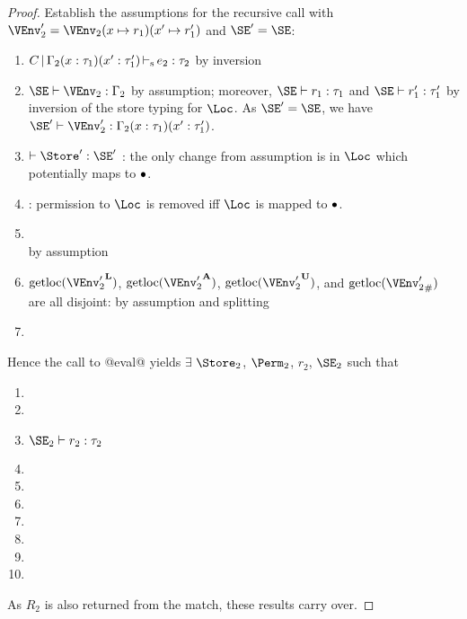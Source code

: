 \begin{proof}
  Establish the assumptions for the recursive call
  with $\VEnv'_2 = \VEnv_2 (x\mapsto r_1) (x' \mapsto r_1')$ and $\SE' = \SE$:
  \begin{enumerate}[({A1-}1)]
  \item $C \operatorname{|} \Gamma_2 (x:\tau_1) (x':\tau'_1) \operatorname{\vdash_s} e_2 : \tau_2$ by inversion
  \item $\SE \vdash \VEnv_2 : \E_2$  by assumption; moreover, $\SE
    \vdash r_1 : \tau_1$ and $\SE \vdash r_1' : \tau'_1$ by inversion
    of the store typing for $\Loc$. As $\SE'=\SE$, we have $\SE' \vdash \VEnv_2' : \E_2 (x:\tau_1) (x':\tau_1')$.
  \item $\vdash \Store' : \SE'$ : the only change from assumption is in
    $\Loc$ which potentially maps to $\bullet$.
  \item {} : permission to $\Loc$ is removed iff
    $\Loc$ is mapped to $\bullet$.
  \item {} \\
    by assumption
  \item $\Rawloc{\Active{\VEnv'_2}}$,
    $\Rawloc{\MutableBorrows{\VEnv'_2}}$,
    $\Rawloc{\ImmutableBorrows{\VEnv'_2}}$, and
    $\Rawloc{\Suspended{\VEnv'_2}}$ are all disjoint: by assumption
    and splitting
  \item {}
  \end{enumerate}

  Hence the call to @eval@ yields
  $\exists$ $\Store_2$, $\Perm_2$, $r_2$, $\SE_2$ such that
  \begin{enumerate}[({R1-}1)]
  \item {}
  \item {}
  \item $\SE_2 \vdash r_2 : \tau_2$
  \item {}
  \item {}
  \item {}
  \item {}
  \item {}
  \item {}
  \item {}
  \end{enumerate}
  As $R_2$ is also returned from the match, these results carry over.
  

\end{proof}
